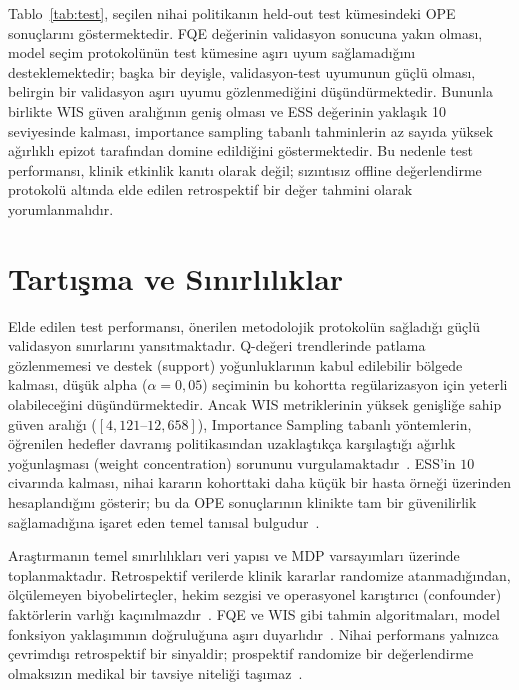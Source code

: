 \documentclass[11pt,a4paper]{article}
\begin{document}
Tablo~\ref{tab:test}, seçilen nihai politikanın held-out test kümesindeki OPE sonuçlarını göstermektedir. FQE değerinin validasyon sonucuna yakın olması, model seçim protokolünün test kümesine aşırı uyum sağlamadığını desteklemektedir; başka bir deyişle, validasyon-test uyumunun güçlü olması, belirgin bir validasyon aşırı uyumu gözlenmediğini düşündürmektedir. Bununla birlikte WIS güven aralığının geniş olması ve ESS değerinin yaklaşık 10 seviyesinde kalması, importance sampling tabanlı tahminlerin az sayıda yüksek ağırlıklı epizot tarafından domine edildiğini göstermektedir. Bu nedenle test performansı, klinik etkinlik kanıtı olarak değil; sızıntısız offline değerlendirme protokolü altında elde edilen retrospektif bir değer tahmini olarak yorumlanmalıdır.

\section{Tartışma ve Sınırlılıklar}

Elde edilen test performansı, önerilen metodolojik protokolün sağladığı güçlü validasyon sınırlarını yansıtmaktadır. Q-değeri trendlerinde patlama gözlenmemesi ve destek (support) yoğunluklarının kabul edilebilir bölgede kalması, düşük alpha ($\alpha=0{,}05$) seçiminin bu kohortta regülarizasyon için yeterli olabileceğini düşündürmektedir. Ancak WIS metriklerinin yüksek genişliğe sahip güven aralığı ($[4{,}121\text{--}12{,}658]$), Importance Sampling tabanlı yöntemlerin, öğrenilen hedefler davranış politikasından uzaklaştıkça karşılaştığı ağırlık yoğunlaşması (weight concentration) sorununu vurgulamaktadır~\cite{precup2000eligibility,fujimoto2019off}. ESS'in $10$ civarında kalması, nihai kararın kohorttaki daha küçük bir hasta örneği üzerinden hesaplandığını gösterir; bu da OPE sonuçlarının klinikte tam bir güvenilirlik sağlamadığına işaret eden temel tanısal bulgudur~\cite{thomas2015highconfidence}.

Araştırmanın temel sınırlılıkları veri yapısı ve MDP varsayımları üzerinde toplanmaktadır. Retrospektif verilerde klinik kararlar randomize atanmadığından, ölçülemeyen biyobelirteçler, hekim sezgisi ve operasyonel karıştırıcı (confounder) faktörlerin varlığı kaçınılmazdır~\cite{komorowski2018ai,gottesman2019guidelines}. FQE ve WIS gibi tahmin algoritmaları, model fonksiyon yaklaşımının doğruluğuna aşırı duyarlıdır~\cite{voloshin2021empirical}. Nihai performans yalnızca çevrimdışı retrospektif bir sinyaldir; prospektif randomize bir değerlendirme olmaksızın medikal bir tavsiye niteliği taşımaz~\cite{tang2021model}.
\end{document}
